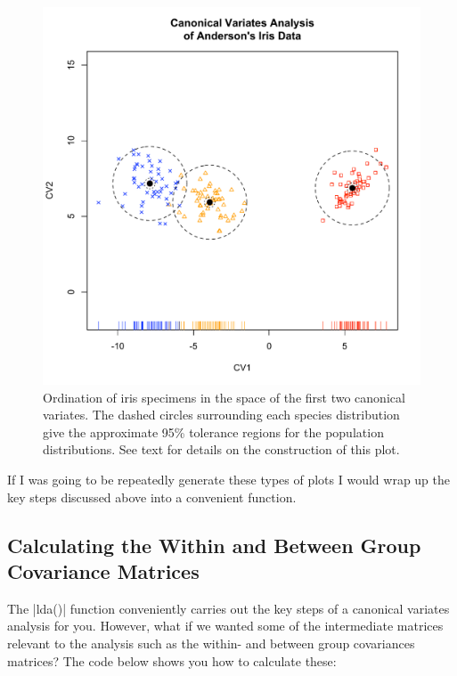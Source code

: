 \begin{figure}
\begin{center}
\includegraphics[height=0.8\columnwidth]{./figures/hands-on8/iris-cva-fancy}
\end{center}
\caption{Ordination of iris specimens in the space of the first two canonical variates.  The dashed circles surrounding each species distribution give the approximate 95\% tolerance regions for the population distributions. See text for details on the construction of this plot.}
\end{figure}

If I was going to be repeatedly generate these types of plots I would wrap up the key steps discussed above into a convenient function.


\subsection{Calculating the Within and Between Group Covariance Matrices}

The |lda()| function conveniently carries out the key steps of a canonical variates analysis for you.  However, what if we wanted some of the intermediate matrices relevant to the analysis such as the within- and between group covariances matrices? The code below shows you how to calculate these:


